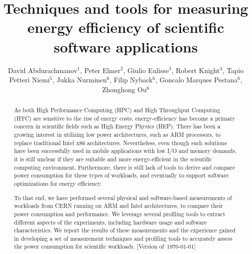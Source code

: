 \documentclass[a4paper]{jpconf}
\begin{document}



\title{Techniques and tools for measuring energy efficiency of scientific software applications}

\author{David Abdurachmanov$^1$, Peter Elmer$^2$, Giulio Eulisse$^3$, Robert Knight$^4$, Tapio Petteri Niemi$^5$, Jukka Nurminen$^6$, Filip Nyback$^6$, Goncalo Marques Pestana$^6$, Zhonghong Ou$^6$}

\address{$^1$ Digital Science and Computing Center, Faculty of Mathematics and Informatics, Vilnius University, Vilnius, Lithuania}
\address{$^2$ Department of Physics, Princeton University, Princeton, NJ 08540, USA}
\address{$^3$ Fermilab, Batavia, IL 60510, USA}
\address{$^4$ Research Computing, Office of Information Technology, Princeton University, Princeton, New Jersey 08540, USA}
\address{$^5$ Helsinki Institute of Physics, PO Box 64, FI-00014, Helsinki, Finland }
\address{$^6$ Aalto University, PO Box 11100, 00076 Aalto, Finland}


\begin{abstract}
As both High Performance Computing (HPC) and High Throughput Computing
(HTC) are sensitive to the rise of energy costs, energy-efficiency
has become a primary concern in scientific fields such as High
Energy Physics (HEP). There has been a growing interest in utilizing
low power architectures, such as ARM processors, to replace traditional
Intel x86 architectures. Nevertheless, even though such solutions
have been successfully used in mobile applications with low I/O and
memory demands, it is still unclear if they are suitable and more
energy-efficient in the scientific computing environment. Furthermore,
there is still lack of tools to derive and compare power consumption
for these types of workloads, and eventually to support software
optimizations for energy efficiency.

To that end, we have performed several physical and software-based
measurements of workloads from CERN running on ARM and Intel
architectures, to compare their power consumption and performance.
We leverage several profiling tools to extract different aspects
of the experiments, including hardware usage and software
characteristics. We report the results of these measurements and
the experience gained in developing a set of measurement techniques
and profiling tools to accurately assess the power consumption for
scientific workloads. [Version of~\today]
\end{abstract}
\end{document}
